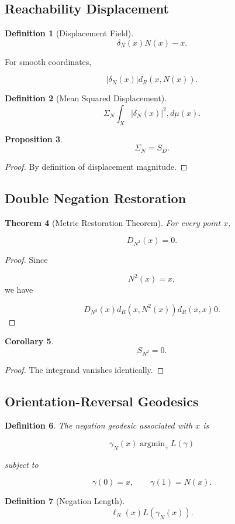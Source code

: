 \documentclass[12pt]{article}
\newtheorem{theorem}{Theorem}[section]
\newtheorem{proposition}[theorem]{Proposition}
\newtheorem{corollary}[theorem]{Corollary}
\newtheorem{definition}[theorem]{Definition}
\theoremstyle{remark}
\begin{document}
\subsection{Reachability Displacement}

\begin{definition}[Displacement Field]
\[
\delta_N(x)
N(x)-x.
\]
\end{definition}

For smooth coordinates,

\[
|\delta_N(x)|
d_R(x,N(x)).
\]

\begin{definition}[Mean Squared Displacement]
\[
\Sigma_N
\int_X
|\delta_N(x)|^2
,d\mu(x).
\]
\end{definition}

\begin{proposition}
\[
\Sigma_N=S_D.
\]
\end{proposition}
\begin{proof}
By definition of displacement magnitude.
\end{proof}

\subsection{Double Negation Restoration}

\begin{theorem}[Metric Restoration Theorem]
For every point \(x\),

\[
D_{N^2}(x)=0.
\]
\end{theorem}
\begin{proof}
Since

\[
N^2(x)=x,
\]
we have

\[
D_{N^2}(x)
d_R(x,N^2(x))

d_R(x,x)

0. 

\]
\end{proof}

\begin{corollary}
\[
S_{N^2}=0.
\]
\end{corollary}
\begin{proof}
The integrand vanishes identically.
\end{proof}

\subsection{Orientation-Reversal Geodesics}

\begin{definition}
The negation geodesic associated with \(x\) is

\[
\gamma_N(x)
\operatorname{argmin}_{\gamma}
L(\gamma)
\]

subject to

\[
\gamma(0)=x,
\qquad
\gamma(1)=N(x).
\]
\end{definition}
\begin{definition}[Negation Length]
\[
\ell_N(x)
L(\gamma_N(x)).
\]
\end{definition}
\end{document}
